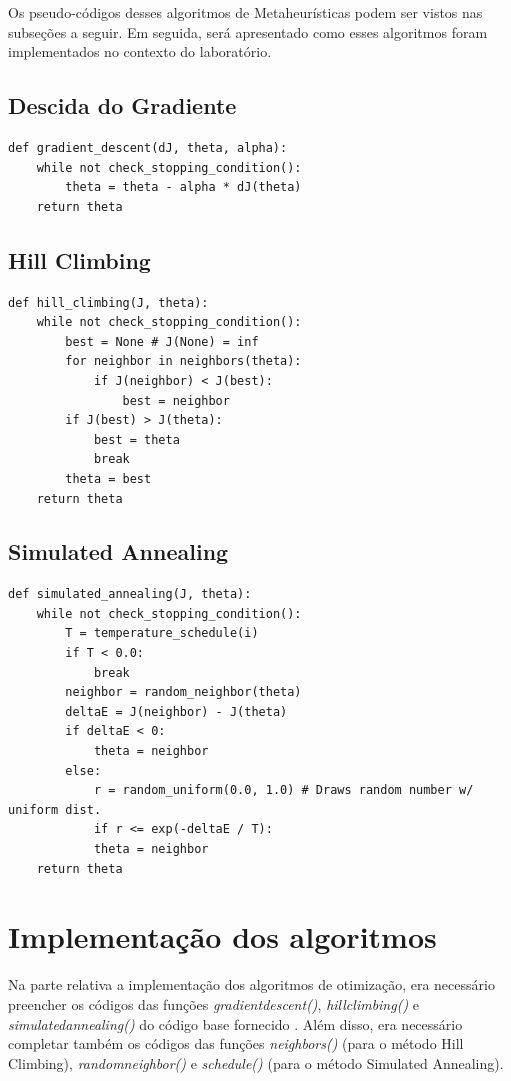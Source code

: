 \documentclass[conference]{IEEEtran}
\begin{document}
Os pseudo-códigos desses algoritmos de Metaheurísticas podem ser vistos nas subseções a seguir. Em seguida, será apresentado como esses algoritmos foram implementados no contexto do laboratório.

\subsection{Descida do Gradiente}
\begin{lstlisting}
def gradient_descent(dJ, theta, alpha):
	while not check_stopping_condition():
		theta = theta - alpha * dJ(theta)
	return theta
\end{lstlisting}

\subsection{Hill Climbing}
\begin{lstlisting}
def hill_climbing(J, theta):
	while not check_stopping_condition():
		best = None # J(None) = inf
		for neighbor in neighbors(theta):
			if J(neighbor) < J(best):
				best = neighbor
		if J(best) > J(theta):
			best = theta
			break
		theta = best
	return theta
\end{lstlisting}

\subsection{Simulated Annealing}
\begin{lstlisting}
def simulated_annealing(J, theta):
	while not check_stopping_condition():
		T = temperature_schedule(i)
		if T < 0.0:
			break
		neighbor = random_neighbor(theta)
		deltaE = J(neighbor) - J(theta)
		if deltaE < 0:
			theta = neighbor
		else:
			r = random_uniform(0.0, 1.0) # Draws random number w/ uniform dist.
			if r <= exp(-deltaE / T):
			theta = neighbor
	return theta
\end{lstlisting}

\section{Implementação dos algoritmos}
Na parte relativa a implementação dos algoritmos de otimização, era necessário preencher os códigos das funções \textit{gradient\underline{\space}descent()}, \textit{hill\underline{\space}climbing()} e \textit{simulated\underline{\space}annealing()} do código base fornecido \cite{b1}.  Além disso, era necessário completar também os códigos das funções \textit{neighbors()} (para o método Hill Climbing), \textit{random\underline{\space}neighbor()} e \textit{schedule()} (para o método Simulated Annealing). 
\end{document}

